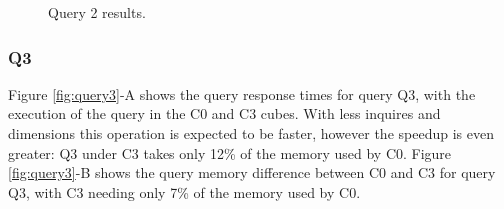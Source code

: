 \begin{figure}[H]
  \caption{Query 2 results.}\label{fig:query2}
  \vspace{6mm}
  \begin{center}
  \end{center}
  \vspace{2mm}
\end{figure}

\hypertarget{q3-1}{%
\subsubsection{Q3}\label{q3-1}}

Figure \ref{fig:query3}-A shows the query response times for query Q3, with the execution of the query in the C0 and C3 cubes.
With less inquires and dimensions this operation is expected to be faster, however the speedup is even greater: Q3 under C3 takes only 12\% of the memory used by C0.
Figure \ref{fig:query3}-B shows the query memory difference between C0 and C3 for query Q3, with C3 needing only 7\% of the memory used by C0.

